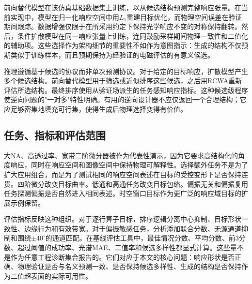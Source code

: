 前向替代模型在该仿真基础数据集上训练，以从候选结构预测完整响应张量。在当前实现中，模型在归一化响应空间中用$L_1$重建目标优化，而物理空间误差在验证期间跟踪。数据增强仅限于在所采用约定下保持光学响应不变的对称保持翻转。然后，条件扩散模型在同一响应张量上训练，连同鼓励采样期间物理一致性和二值化的辅助项。这些选择作为架构细节的重要性不如作为意图指示：生成的结构不仅预期类似于训练样本，而且预期保持为经验证的电磁评估的有意义候选。

推理遵循基于候选的协议而非单次预测协议。对于给定的目标响应，扩散模型产生多个候选结构。前向替代模型用于筛选或近似排序这些候选，之后用RCWA重新评估所选结构。最终排序使用从验证场派生的任务感知响应指标。这种候选级程序使逆向问题的"一对多"特性明确。有用的逆向设计器不应仅返回一个合理结构；它应足够密集地填充可行集，使得生成后物理选择变得有价值。

\subsection{任务、指标和评估范围}

大NA、高透过率、宽带二阶微分器被作为代表性演示，因为它要求高结构化的角度响应，同时在响应空间和图像空间中保持物理可解释性。选择额外任务不是为了扩大应用组合，而是为了测试相同的响应空间表述在目标的受控变形下是否保持连贯。四阶微分改变目标曲率。低通和高通任务改变目标包络。偏振无关和偏振复用任务探测偏振是否自然进入相同表述。时空窗口目标作为更广泛的响应域目标的扩展示例保留。

评估指标反映这种组织。对于逐行算子目标，排序逻辑分离中心抑制、目标形状一致性、边缘行为和有效带宽。对于偏振敏感任务，分析添加联合分数、无源通道抑制和围绕$\pm40^\circ$的通道匹配。在基线评估工具中，最佳情况分数、平均分数、前3分数、超过阈值的成功率、光谱MAE、二值率和候选多样性都显式计算。这些量不是作为任意工程诊断集合报告的。它们对应于本文的核心问题：响应形状是否正确、物理验证是否与名义预测一致、是否保持候选多样性、生成的结构是否保持作为二值超表面的实际可用性。
